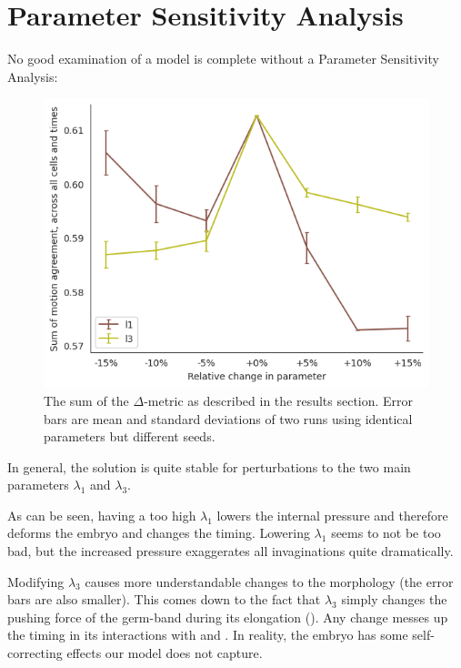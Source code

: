 \section{Parameter Sensitivity Analysis}
No good examination of a model is complete without a Parameter Sensitivity Analysis:
\begin{figure}[H]
    \centering
    \includegraphics[width=0.8\linewidth]{chapters/Results/figures/PSA.png}
    \caption{The sum of the $\Delta$-metric as described in the results section. Error bars are mean and standard deviations of two runs using identical parameters but different seeds. }
    \label{fig:enter-label}
\end{figure}

In general, the solution is quite stable for perturbations to the two main parameters $\lambda_1$ and $\lambda_3$.

As can be seen, having a too high $\lambda_1$ lowers the internal pressure and therefore deforms the embryo and changes the timing. Lowering $\lambda_1$ seems to not be too bad, but the increased pressure exaggerates all invaginations quite dramatically.

Modifying $\lambda_3$ causes more understandable changes to the morphology (the error bars are also smaller). This comes down to the fact that $\lambda_3$ simply changes the pushing force of the germ-band during its elongation (). Any change messes up the timing in its interactions with  and . In reality, the embryo has some self-correcting effects our model does not capture.




